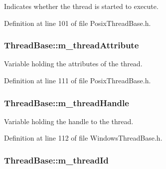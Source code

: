 Indicates whether the thread is started to execute. 



Definition at line 101 of file Posix\-Thread\-Base.\-h.

\hypertarget{class_thread_base_ad0d98c6f93707aef346cc66d8de78729}{
\subsubsection[{m\-\_\-thread\-Attribute}]{ Thread\-Base\-::m\-\_\-thread\-Attribute\hspace{0.3cm}{\ttfamily [private]}}}\label{class_thread_base_ad0d98c6f93707aef346cc66d8de78729}


Variable holding the attributes of the thread. 



Definition at line 111 of file Posix\-Thread\-Base.\-h.

\hypertarget{class_thread_base_a4f279b94eef423109969f69fadd9e674}{
\subsubsection[{m\-\_\-thread\-Handle}]{ Thread\-Base\-::m\-\_\-thread\-Handle\hspace{0.3cm}{\ttfamily [private]}}}\label{class_thread_base_a4f279b94eef423109969f69fadd9e674}


Variable holding the handle to the thread. 



Definition at line 112 of file Windows\-Thread\-Base.\-h.

\hypertarget{class_thread_base_ae8574271bdcbfd80cbdde64c77bc7148}{
\subsubsection[{m\-\_\-thread\-Id}]{ Thread\-Base\-::m\-\_\-thread\-Id\hspace{0.3cm}{\ttfamily [private]}}}\label{class_thread_base_ae8574271bdcbfd80cbdde64c77bc7148}


